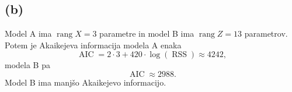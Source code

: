 \documentclass{article}
\DeclareMathOperator*{\rang}{rang}
\DeclareMathOperator*{\akaik}{AIC}
\DeclareMathOperator*{\rss}{RSS}
\begin{document}
\subsection*{(b)}
Model A ima $\rang X = 3$ parametre in model B ima $\rang Z = 13$ parametrov. Potem je Akaikejeva informacija modela A enaka
\begin{equation*}
    \akaik = 2\cdot 3 + 420 \cdot \log(\rss) \approx 4242,
\end{equation*}
modela B pa
\begin{equation*}
    \akaik \approx 2988.
\end{equation*}
Model B ima manjšo Akaikejevo informacijo.    
\end{document}

